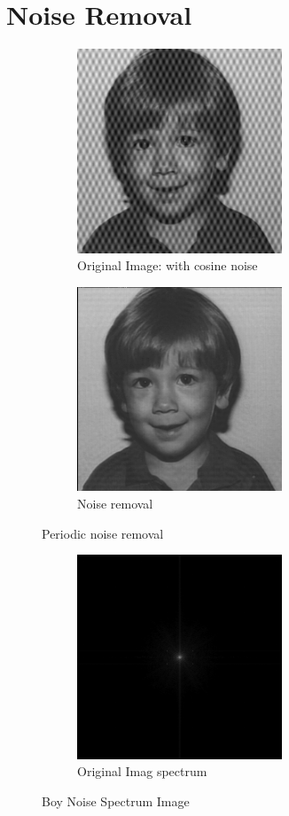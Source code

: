 \documentclass[letterpaper]{article}
\begin{document}
\section{Noise Removal}
\begin{figure}[hbtp]
  \centering
  \begin{subfigure}{6.1cm}
    \includegraphics[width=6.1cm]{images/boy_noisy.png}
    \caption{Original Image: with cosine noise}
  \end{subfigure}
  \begin{subfigure}{6.1cm}
    \includegraphics[width=6.1cm]{images/boy_denoise.png}
    \caption{Noise removal}
  \end{subfigure}
  \caption{Periodic noise removal	}
  \label{fig:noise_periodic}
\end{figure}
\begin{figure}[hbtp]
  \centering
  \begin{subfigure}{6.1cm}
    \includegraphics[width=6.1cm]{images/FT_boy_noisy.png}
    \caption{Original Imag spectrum}
  \end{subfigure}
  \caption{Boy Noise Spectrum Image}
  \label{fig:noise_periodic}
\end{figure}
\end{document}
